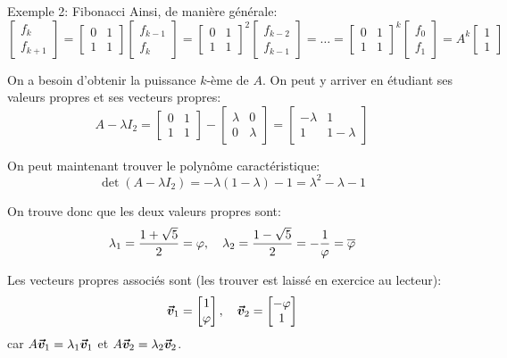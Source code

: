 \documentclass[a4paper]{article}
\begin{document}
\begin{parag}{Exemple 2: Fibonacci}
    Ainsi, de manière générale: 
    \[\begin{bmatrix} f_k \\ f_{k+1} \end{bmatrix} = \begin{bmatrix} 0 & 1 \\ 1 & 1 \end{bmatrix} \begin{bmatrix} f_{k-1} \\ f_{k} \end{bmatrix} = \begin{bmatrix} 0 & 1 \\ 1 & 1 \end{bmatrix}^2 \begin{bmatrix} f_{k-2} \\ f_{k-1} \end{bmatrix} = \ldots = \begin{bmatrix} 0 & 1 \\ 1 & 1 \end{bmatrix}^{k} \begin{bmatrix} f_0 \\ f_1 \end{bmatrix} = A^{k} \begin{bmatrix} 1 \\ 1 \end{bmatrix} \]
    
    On a besoin d'obtenir la puissance $k$-ème de $A$. On peut y arriver en étudiant ses valeurs propres et ses vecteurs propres: 
    \[A - \lambda I_2 = \begin{bmatrix} 0 & 1 \\ 1 & 1 \end{bmatrix} - \begin{bmatrix} \lambda & 0 \\ 0 & \lambda \end{bmatrix} = \begin{bmatrix} -\lambda & 1 \\ 1 & 1 - \lambda \end{bmatrix}  \]

    On peut maintenant trouver le polynôme caractéristique: 
    \[\det\left(A - \lambda I_2\right) = -\lambda\left(1 - \lambda\right) -1 = \lambda^2 - \lambda - 1\]
    
    On trouve donc que les deux valeurs propres sont: 
    \[\lambda_1 = \frac{1 + \sqrt{5}}{2} = \varphi, \quad \lambda_2 = \frac{1 - \sqrt{5}}{2} = -\frac{1}{\varphi} = \overline{\varphi}\]
    
    Les vecteurs propres associés sont (les trouver est laissé en exercice au lecteur): 
    \[\bm{\protect\vec{v}}_1 = \begin{bmatrix} 1 \\ \varphi \end{bmatrix}, \quad \bm{\protect\vec{v}}_2 = \begin{bmatrix} -\varphi \\ 1 \end{bmatrix} \]
    car $A \bm{\protect\vec{v}}_1 = \lambda_1 \bm{\protect\vec{v}}_1$ et $A \bm{\protect\vec{v}}_2 = \lambda_2 \bm{\protect\vec{v}}_2$.


\end{parag}
\end{document}
